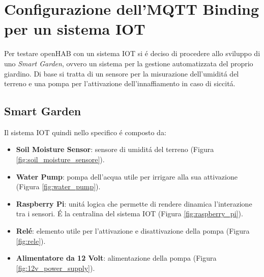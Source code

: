 \chapter{Configurazione dell'MQTT Binding per un sistema IOT}
Per testare openHAB con un sistema IOT si \'e deciso di procedere allo sviluppo di uno {\em Smart Garden}, ovvero un sistema per la gestione automatizzata del proprio giardino. Di base si tratta di un sensore per la misurazione dell'umidit\'a del terreno e una pompa per l'attivazione dell'innaffiamento in caso di siccit\'a.

\section{Smart Garden}
Il sistema IOT quindi nello specifico \'e composto da:
\begin{itemize}
    \item \textbf{Soil Moisture Sensor}: sensore di umidit\'a del terreno (Figura \ref{fig:soil_moisture_sensore}).
    \item \textbf{Water Pump}: pompa dell'acqua utile per irrigare alla sua attivazione (Figura \ref{fig:water_pump}).
    \item \textbf{Raspberry Pi}: unit\'a logica che permette di rendere dinamica l'interazione tra i sensori. \'E la centralina del sistema IOT (Figura \ref{fig:raspberry_pi}).
    \item \textbf{Rel\'e}: elemento utile per l'attivazione e disattivazione della pompa (Figura \ref{fig:rele}).
    \item \textbf{Alimentatore da 12 Volt}: alimentazione della pompa (Figura \ref{fig:12v_power_supply}).
\end{itemize}

